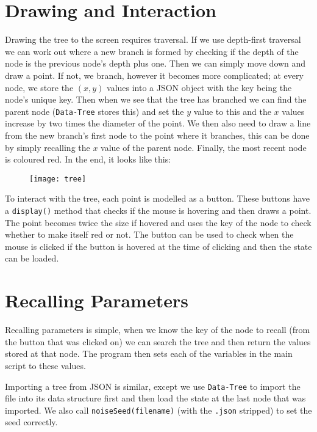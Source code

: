 \section{Drawing and Interaction}
Drawing the tree to the screen requires traversal. If we use depth-first
traversal we can work out where a new branch is formed by checking if the depth
of the node is the previous node's depth plus one. Then we can simply move down
and draw a point. If not, we branch, however it becomes more complicated; at
every node, we store the $(x,y)$ values into a JSON object with the key being the
node's unique key. Then when we see that the tree has branched we can find the
parent node (\verb|Data-Tree| stores this) and set the $y$ value to this and the
$x$ values increase by two times the diameter of the point. We then also need
to draw a line from the new branch's first node to the point where it branches,
this can be done by simply recalling the $x$ value of the parent node. Finally,
the most recent node is coloured red. In the end, it looks like this:

\begin{figure}[H]
    \centering
    \texttt{[image: tree]}
    \caption{}
\end{figure}

To interact with the tree, each point is modelled as a button. These buttons
have a \verb|display()| method that checks if the mouse is hovering and then
draws a point. The point becomes twice the size if hovered and uses the key of
the node to check whether to make itself red or not. The button can be used to
check when the mouse is clicked if the button is hovered at the time of clicking
and then the state can be loaded.

\section{Recalling Parameters}
Recalling parameters is simple, when we know the key of the node to recall (from
the button that was clicked on) we can search the tree and then return the
values stored at that node. The program then sets each of the variables in the
main script to these values.

Importing a tree from JSON is similar, except we use \verb|Data-Tree| to import
the file into its data structure first and then load the state at the last node
that was imported. We also call \verb|noiseSeed(filename)| (with the
\verb|.json| stripped) to set the seed correctly.

